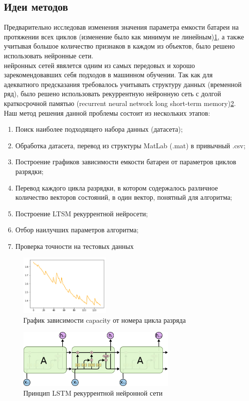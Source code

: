 \documentclass[russian,english,18pt,a4paper,reqno,dviphfm]{article}
\begin{document}
\newpage
\subsection{Идеи методов}
Предварительно исследовав изменения значения параметра емкости батареи на протяжении всех циклов (изменение было как минимум не линейным)\ref{fig:1}, а также учитывая большое количество признаков в каждом из объектов, было решено использовать нейронные сети. \\
 нейронных сетей явялется одним из самых передовых и хорошо зарекомендовавших себя подходов в машинном обучении. Так как для адекватного предсказания требовалось учитывать структуру данных (временной ряд), было решено использовать рекуррентную нейронную сеть с долгой краткосрочной памятью (recurrent neural network long short-term memory)\ref{fig:2}. \\
Наш метод решения данной проблемы состоит из нескольких этапов:
\begin{enumerate}
	\item Поиск наиболее подходящего набора данных (датасета);
	\item Обработка датасета, перевод из структуры MatLab (.mat) в привычный .csv;
	\item Построение графиков зависимости емкости батареи от параметров циклов разрядки;
	\item Перевод каждого цикла разрядки, в котором содержалось различное количество векторов состояний, в один вектор, понятный для алгоритма;
	\item Построение LTSM рекуррентной нейросети;
	\item Отбор наилучших параметров алгоритма;
	\item Проверка точности на тестовых данных
\end{enumerate}
\begin{figure}[h!]
	\center
	\includegraphics[width=0.4\textwidth]{pic/cap.png}
	\caption{График зависимости capacity от номера цикла разряда} 
	\label{fig:1}
\end{figure}
\begin{figure}[h!]
	\center
	\includegraphics[width=0.7\textwidth]{pic/LSTM3-chain.png}
	\caption{Принцип LSTM рекуррентной нейронной сети} 
	\label{fig:2}
\end{figure}
\newpage
\end{document}
